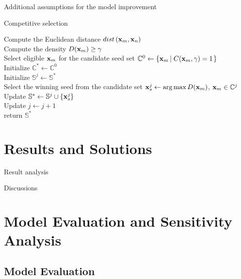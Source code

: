 \documentclass[12pt,a4paper]{article}
\begin{document}
\begin{spacing}{1.2}
Additional assumptions for the model improvement


\begin{algorithm}  
    \caption{Competitive selection}  
    \label{CompetitiveSeedSelectionAlgorithm}
    
    Compute the Euclidean distance $dist \left( {\bold{x}_m}, {\bold{x}_n} \right)$ \\  
    Compute the density $D( {\bold{x}_m} ) \ge \gamma$ \\ 
    Select eligible $\bold{x}_m$ for the candidate seed set $\mathbb{C}^0 \gets \left\{  \bold{x}_m \left| \; C( {\bold{x}_m}, \gamma ) = 1\right. \right\}$ \\ 
    Initialize $\mathbb{C}^* \gets \mathbb{C}^0$\\
    { 
      Initialize $\mathbb{S}^j \gets \mathbb{S}^*$ \\
      Select the winning seed from the candidate set $\bold{x}_s^j \gets \mathop {\arg \max } D({\bold{x}_m})$, ${\bold{x}_m} \in \mathbb{C}^j$ \\
      Update $\mathbb{S}^* \gets \mathbb{S}^j \cup \{ \bold{x}_s^j \}$ \\
      Update $j \gets j + 1$ \\
    }
    return $\mathbb{S}^*$ \\
\end{algorithm} 


\section{Results and Solutions}
\label{Results_Solutions}

Result analysis

Discussions



\section{Model Evaluation and Sensitivity Analysis}
\label{ModelEvaluation_SensitivityAnalysis}



\subsection{Model Evaluation}



\end{spacing}
\end{document}
